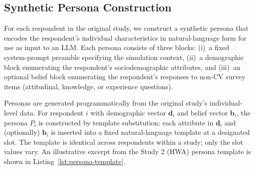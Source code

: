 \documentclass[12pt]{article}
\begin{document}
\subsection{Synthetic Persona Construction}\label{sec:methods-persona}

For each respondent in the original study, we construct a synthetic persona that encodes the respondent's individual characteristics in natural-language form for use as input to an LLM. Each persona consists of three blocks: (i)~a fixed system-prompt preamble specifying the simulation context, (ii)~a demographic block enumerating the respondent's sociodemographic attributes, and (iii)~an optional belief block enumerating the respondent's responses to non-CV survey items (attitudinal, knowledge, or experience questions).

Personas are generated programmatically from the original study's individual-level data. For respondent $i$ with demographic vector $\mathbf{d}_i$ and belief vector $\mathbf{b}_i$, the persona $P_i$ is constructed by template substitution: each attribute in $\mathbf{d}_i$ and (optionally) $\mathbf{b}_i$ is inserted into a fixed natural-language template at a designated slot. The template is identical across respondents within a study; only the slot values vary. An illustrative excerpt from the Study 2 (HWA) persona template is shown in Listing~\ref{lst:persona-template}.
\end{document}
